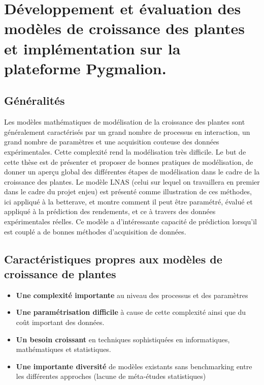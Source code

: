 \section{Développement et évaluation des modèles de croissance des plantes et implémentation sur la plateforme Pygmalion.}

\subsection{Généralités}

Les modèles mathématiques de modélisation de la croissance des plantes sont généralement caractérisés par un grand nombre de processus en interaction,  un grand nombre de paramètres et une acquisition couteuse des données expérimentales. Cette complexité rend la modélisation très difficile. Le but de cette thèse est de présenter et proposer de bonnes pratiques de modélisation, de donner un aperçu global des différentes étapes de modélisation dans le cadre de la croissance des plantes.
Le modèle LNAS (celui sur lequel on travaillera en premier dans le cadre du projet enjeu) est présenté comme illustration de ces méthodes, ici appliqué à la betterave, et montre comment il peut être paramétré, évalué et appliqué à la prédiction des rendements, et ce à travers des données expérimentales réelles. Ce modèle a d’intéressante capacité de prédiction lorsqu’il est couplé a de bonnes méthodes d’acquisition de données.

\subsection{Caractéristiques propres aux modèles de croissance de plantes}

\begin{itemize}

\item \textbf{Une complexité importante} au niveau des processus et des paramètres
\item \textbf{Une paramétrisation difficile} à cause de cette complexité ainsi que du coût important des données.
\item \textbf{Un besoin croissant} en techniques sophistiquées en informatiques, mathématiques et statistiques.
\item \textbf{Une importante diversité} de modèles existants sans benchmarking entre les différentes approches (lacune de méta-études statistiques)

\end{itemize}

